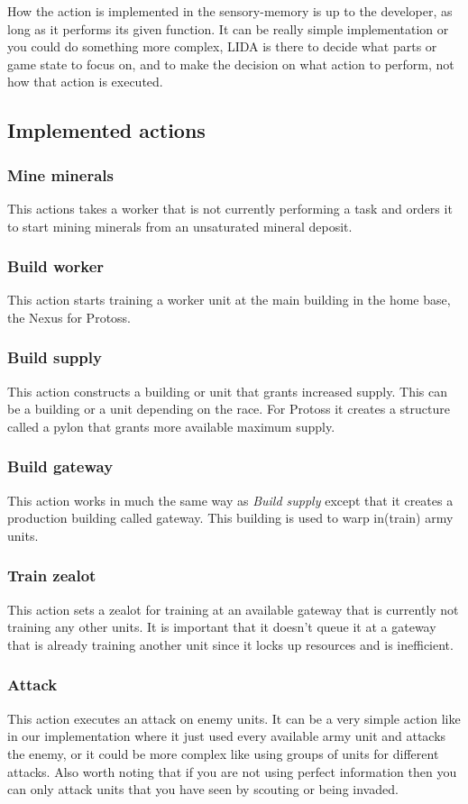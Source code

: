 How the action is implemented in the sensory-memory is up to the developer, as long as it performs its given function. It can be really simple implementation or you could do something more complex, LIDA is there to decide what parts or game state to focus on, and to make the decision on what action to perform, not how that action is executed.

\subsection{Implemented actions}
\subsubsection{Mine minerals}
This actions takes a worker that is not currently performing a task and orders it to start mining minerals from an unsaturated mineral deposit.

\subsubsection{Build worker}
This action starts training a worker unit at the main building in the home base, the Nexus for Protoss.

\subsubsection{Build supply}
This action constructs a building or unit that grants increased supply. This can be a building or a unit depending on the race. For Protoss it creates a structure called a pylon that grants more available maximum supply.

\subsubsection{Build gateway}
This action works in much the same way as {\em Build supply} except that it creates a production building called gateway. This building is used to warp in(train) army units.

\subsubsection{Train zealot}
This action sets a zealot for training at an available gateway that is currently not training any other units. It is important that it doesn't queue it at a gateway that is already training another unit since it locks up resources and is inefficient.

\subsubsection{Attack}
This action executes an attack on enemy units. It can be a very simple action like in our implementation where it just used every available army unit and attacks the enemy, or it could be more complex like using groups of units for different attacks. Also worth noting that if you are not using perfect information then you can only attack units that you have seen by scouting or being invaded.
